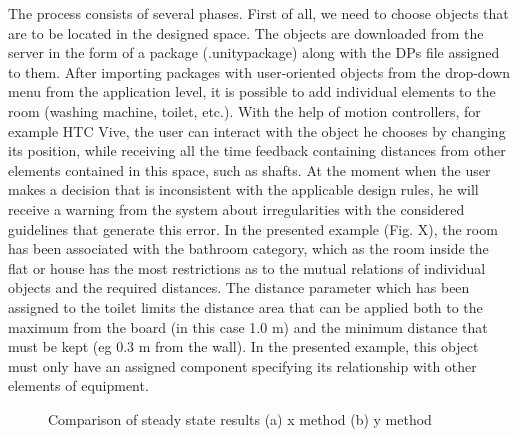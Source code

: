 \documentclass[runningheads]{llncs}
\begin{document}
The process consists of several phases. First of all, we need to choose objects that are to be located in the designed space. The objects are downloaded from the server in the form of a package (.unitypackage) along with the DPs file assigned to them. After importing packages with user-oriented objects from the drop-down menu from the application level, it is possible to add individual elements to the room (washing machine, toilet, etc.). With the help of motion controllers, for example HTC Vive, the user can interact with the object he chooses by changing its position, while receiving all the time feedback containing distances from other elements contained in this space, such as shafts.
At the moment when the user makes a decision that is inconsistent with the applicable design rules, he will receive a warning from the system about irregularities with the considered guidelines that generate this error.
In the presented example (Fig. X), the room has been associated with the bathroom category, which as the room inside the flat or house has the most restrictions as to the mutual relations of individual objects and the required distances. The distance parameter which has been assigned to the toilet limits the distance area that can be applied both to the maximum from the board (in this case 1.0 m) and the minimum distance that must be kept (eg 0.3 m from the wall). In the presented example, this object must only have an assigned component specifying its relationship with other elements of equipment.

\begin{figure}[H]
     \centering
     \hspace{0.5cm}
     \caption{Comparison of steady state results (a) x method (b) y method}
     \label{fig7}
\end{figure}
\end{document}
